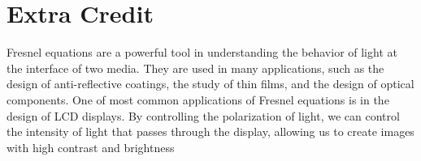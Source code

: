 \documentclass[10pt]{article}
\begin{document}
\section{Extra Credit}
Fresnel equations are a powerful tool in understanding the behavior of light at the interface of two media. They are used in many applications, such as the design of anti-reflective coatings, the study of thin films, and the design of optical components. One of most common applications of Fresnel equations is in the design of LCD displays. By controlling the polarization of light, we can control the intensity of light that passes through the display, allowing us to create images with high contrast and brightness\cite{dePooter:02}
\printbibliography
\end{document}
